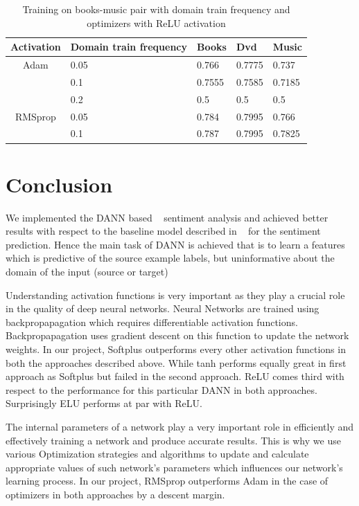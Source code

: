 \documentclass[11pt,a4paper]{article}
\begin{document}
\begin{table}[h]
\begin{center}
\begin{tabular}{|c|l|l|l|l|}
\hline
Activation & \multicolumn{1}{|p{1cm}|}{Domain train frequency}& Books & Dvd & Music \\
\hline
Adam & 0.05 & 0.766 & 0.7775 & 0.737 \\
 & 0.1 & 0.7555 & 0.7585 & 0.7185 \\
 & 0.2 & 0.5 & 0.5 & 0.5 \\
\hline
RMSprop & 0.05 & 0.784 & 0.7995 & 0.766 \\
 & 0.1 & 0.787 & 0.7995 & 0.7825 \\
\hline
\end{tabular}
\end{center}
\caption{ Training on books-music pair with domain train frequency and optimizers with ReLU activation}
\label{1d-optimizer-table}
\end{table}





\section{Conclusion}
We implemented the DANN based ~\cite{Ganin:2016} sentiment analysis and achieved better results with respect to the baseline model described in ~\cite{Britz} for the sentiment prediction. Hence the main task of DANN is achieved that is to learn a features which is predictive of the source example labels, but uninformative about the domain of the input (source or target)

Understanding activation functions is very important as they play a crucial role in the quality of deep neural networks. Neural Networks are trained using backpropapagation which requires differentiable activation functions. Backpropapagation uses gradient descent on this function to update the network weights. In our project, Softplus outperforms every other activation functions in both the approaches described above. While tanh performs equally great in first approach as Softplus but failed in the second approach. ReLU comes third with respect to the performance for this particular DANN in both approaches. Surprisingly ELU performs at par with ReLU.

The internal parameters of a network play a very important role in efficiently and effectively training a network and produce accurate results. This is why we use various Optimization strategies and algorithms to update and calculate appropriate values of such network’s parameters which influences our network’s learning process. In our project, RMSprop outperforms Adam in the case of optimizers in both approaches by a descent margin.
%
%
\end{document}
